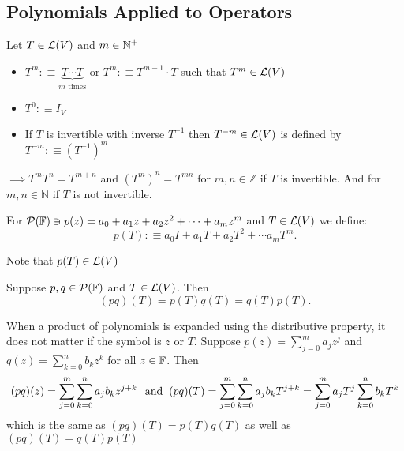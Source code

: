 \subsection{Polynomials Applied to Operators}

\setcounter{thm}{12}
\begin{mydef} [notation $T^m$]
  Let $T \in \mathcal{L}(V)$ and $m\in \mathbb{N}^{+}$
  \begin{itemize}
    \item $T^{m} :\equiv \underbrace{T \cdots T}_{\text{$m$ times}}$ or $T^{m} :\equiv T^{m-1} \cdot T$ such that $T^{m} \in \mathcal{L}(V)$
    \item $T^0 :\equiv I_V$
    \item If $T$ is invertible with inverse $T^{-1}$ then $T^{-m}\in \mathcal{L}(V)$ is defined by $T^{-m} :\equiv (T^{-1})^m$
  \end{itemize}
\end{mydef}
$\implies T^m T^n = T^{m+n}$ and $(T^m)^n=T^{mn}$ for $m,n \in \mathbb{Z}$ if $T$ is invertible. And for $m,n \in \mathbb{N}$ if $T$ is not invertible.

\begin{mydef} [notation $p(T)$]
  For $\mathcal{P} (\mathbb{F}) \ni p(z) = a_0+a_1z+a_2z^2+\cdots+a_mz^m$
 and
  $T \in \mathcal{L} (V)$ we define:
  \begin{equation}
    p(T) :\equiv a_0 I + a_1 T + a_2 T^2 + \cdots a_m T^m.
  \end{equation}

  Note that $p(T) \in \mathcal{L}(V)$
\end{mydef}



\setcounter{thm}{16}
\begin{thm} 
  \label{multiplicative-properties}
  Suppose $p,q \in \mathcal{P} (\mathbb{F})$ and $T\in \mathcal{L} (V)$. Then \begin{equation}
    (p q)(T) = p(T) q(T) = q(T)p(T).
  \end{equation}
\end{thm}
\begin{prf} When a product of polynomials is expanded using the distributive property, it does not matter if the symbol is $z$ or $T$. Suppose $p(z) = \sum_{j=0}^{m} a_j z^j$ and $q(z)=\sum_{k=0}^{n} b_k z^k$ for all $z \in \mathbb{F}$. Then  %
  \begin{equation}
    (pq)(z) = \sum_{j=0}^{m} \sum_{k=0}^{n} a_j b_k z^{j+k} \;\;\, \text{and}\;\;
    (pq)(T) = \sum_{j=0}^{m} \sum_{k=0}^{n} a_j b_k T^{j+k}
    = \sum_{j=0}^{m} a_j T^j \sum_{k=0}^{n}  b_k T^k
  \end{equation}
  which is the same as $(pq)(T) = p(T)q(T)$ as well as $(pq)(T) = q(T)p(T)$
\end{prf}

